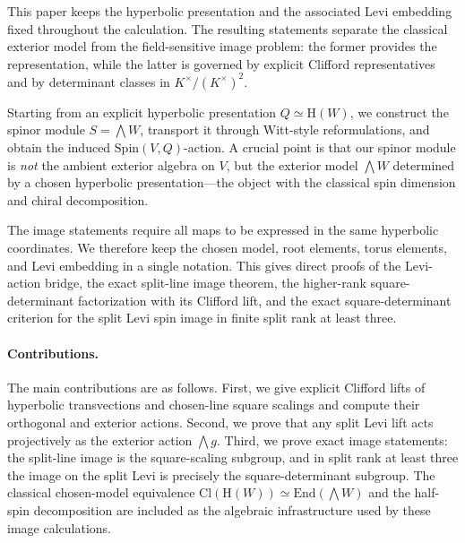 \documentclass{birkjour}
\theoremstyle{plain}
\theoremstyle{definition}
\theoremstyle{remark}
\numberwithin{equation}{section}
\newcommand{\Cl}{\mathrm{Cl}}
\newcommand{\Spin}{\mathrm{Spin}}
\newcommand{\End}{\mathrm{End}}
\newcommand{\Hyp}{\mathrm{H}}
\begin{document}
This paper keeps the hyperbolic presentation and the associated Levi embedding
fixed throughout the calculation. The resulting statements separate the
classical exterior model from the field-sensitive image problem: the former
provides the representation, while the latter is governed by explicit Clifford
representatives and by determinant classes in \(K^\times/(K^\times)^2\).

Starting from an explicit hyperbolic presentation
$Q \simeq \Hyp(W)$, we construct the spinor
module $S=\bigwedge W$, transport it through Witt-style reformulations, and
obtain the induced $\Spin(V,Q)$-action. A crucial point is that our
spinor module is \emph{not} the ambient exterior algebra on $V$, but
the exterior model $\bigwedge W$ determined by a chosen hyperbolic
presentation---the object with the classical spin dimension and
chiral decomposition.

The image statements require all maps to be expressed in the same hyperbolic
coordinates. We therefore keep the chosen model, root elements, torus elements,
and Levi embedding in a single notation. This gives direct proofs of the
Levi-action bridge, the exact split-line image theorem, the higher-rank
square-determinant factorization with its Clifford lift, and the exact
square-determinant criterion for the split Levi spin image in finite split rank
at least three.

\paragraph{Contributions.}
The main contributions are as follows. First, we give explicit Clifford lifts of
hyperbolic transvections and chosen-line square scalings and compute their
orthogonal and exterior actions. Second, we prove that any split Levi lift acts
projectively as the exterior action \(\bigwedge g\). Third, we prove exact image
statements: the split-line image is the square-scaling subgroup, and in split
rank at least three the image on the split Levi is precisely the
square-determinant subgroup. The classical chosen-model equivalence
\(\Cl(\Hyp(W))\simeq \End(\bigwedge W)\) and the half-spin decomposition
are included as the algebraic infrastructure used by these image calculations.
\end{document}
